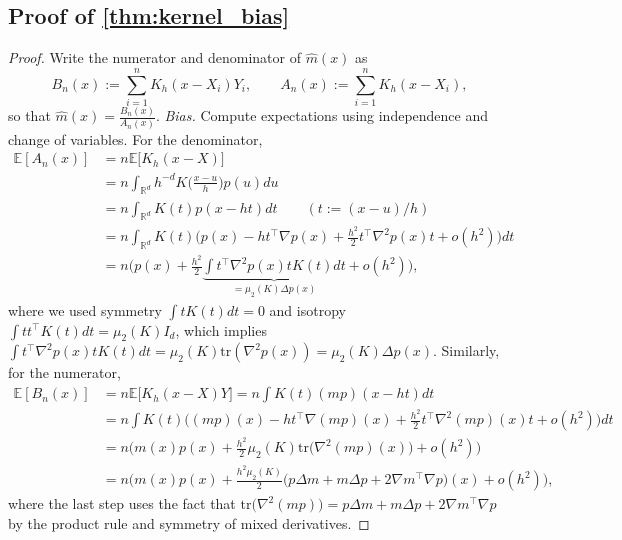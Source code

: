 \subsection{Proof of \cref{thm:kernel_bias}}
\label{proof:kernel_bias}
\begin{proof}
Write the numerator and denominator of $\widehat m(x)$ as
\[
B_n(x):=\sum_{i=1}^n K_h(x-X_i)Y_i,\qquad A_n(x):=\sum_{i=1}^n K_h(x-X_i),
\]
so that $\widehat m(x)=\frac{B_n(x)}{A_n(x)}$.
\emph{Bias.} Compute expectations using independence and change of variables. For the denominator,
\begin{align*}
\mathbb{E}[A_n(x)]
&=n\mathbb{E}\big[K_h(x-X)\big]\\
&=n\int_{\mathbb{R}^d} h^{-d}K\Big(\frac{x-u}{h}\Big)p(u)du\\
&=n\int_{\mathbb{R}^d} K(t)p(x-h t)dt\qquad (t:=(x-u)/h)\\
&=n\int_{\mathbb{R}^d} K(t)\Big(p(x)-ht^\top \nabla p(x)+\frac{h^2}{2}t^\top \nabla^2 p(x)t+o(h^2)\Big)dt\\
&=n\Big(p(x)+\frac{h^2}{2}\underbrace{\int t^\top \nabla^2 p(x)tK(t)dt}_{=\mu_2(K)\Delta p(x)}+o(h^2)\Big),
\end{align*}
where we used symmetry $\int t K(t)dt=0$ and isotropy $\int t t^\top K(t)dt=\mu_2(K) I_d$, which implies $\int t^\top \nabla^2 p(x)tK(t)dt=\mu_2(K)\mathrm{tr}(\nabla^2 p(x))=\mu_2(K)\Delta p(x)$.
Similarly, for the numerator,
\begin{align*}
\mathbb{E}[B_n(x)]
&=n\mathbb{E}\big[K_h(x-X)Y\big]
=n\int K(t)(m p)(x-h t)dt\\
&=n\int K(t)\Big((mp)(x)-ht^\top \nabla(mp)(x)+\frac{h^2}{2}t^\top \nabla^2(mp)(x)t+o(h^2)\Big)dt\\
&=n\Big(m(x)p(x)+\frac{h^2}{2}\mu_2(K)\mathrm{tr}\big(\nabla^2(mp)(x)\big)+o(h^2)\Big)\\
&=n\Big(m(x)p(x)+\frac{h^2\mu_2(K)}{2}\big(p\Delta m + m\Delta p + 2\nabla m^\top \nabla p\big)(x)+o(h^2)\Big),
\end{align*}
where the last step uses the fact that  $\mathrm{tr}\big(\nabla^2(mp)\big)=p\Delta m + m\Delta p + 2\nabla m^\top \nabla p$
by the product rule and symmetry of mixed derivatives. 




\end{proof}

